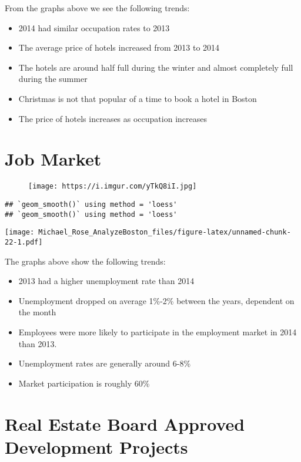 \documentclass[]{article}
\providecommand{\tightlist}{%
  \setlength{\itemsep}{0pt}\setlength{\parskip}{0pt}}
\begin{document}
From the graphs above we see the following trends:

\begin{itemize}
\tightlist
\item
  2014 had similar occupation rates to 2013
\item
  The average price of hotels increased from 2013 to 2014
\item
  The hotels are around half full during the winter and almost
  completely full during the summer
\item
  Christmas is not that popular of a time to book a hotel in Boston
\item
  The price of hotels increases as occupation increases
\end{itemize}

\newpage

\section{Job Market}\label{job-market}

\begin{figure}
\centering
\texttt{[image: https://i.imgur.com/yTkQ8iI.jpg]}
\caption{}
\end{figure}

\begin{verbatim}
## `geom_smooth()` using method = 'loess'
## `geom_smooth()` using method = 'loess'
\end{verbatim}

\texttt{[image: Michael\_Rose\_AnalyzeBoston\_files/figure-latex/unnamed-chunk-22-1.pdf]}

The graphs above show the following trends:

\begin{itemize}
\tightlist
\item
  2013 had a higher unemployment rate than 2014
\item
  Unemployment dropped on average 1\%-2\% between the years, dependent
  on the month
\item
  Employees were more likely to participate in the employment market in
  2014 than 2013.
\item
  Unemployment rates are generally around 6-8\%
\item
  Market participation is roughly 60\%
\end{itemize}

\newpage

\section{Real Estate Board Approved Development
Projects}\label{real-estate-board-approved-development-projects}
\end{document}
